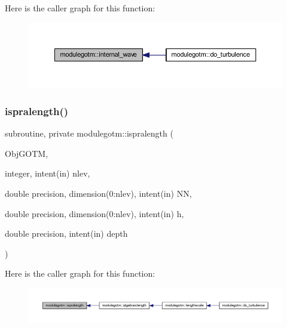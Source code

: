 Here is the caller graph for this function\+:\nopagebreak
\begin{figure}[H]
\begin{center}
\leavevmode
\includegraphics[width=350pt]{namespacemodulegotm_a4287a5fde4824d73e35ee66bf90b5f3b_icgraph}
\end{center}
\end{figure}
\mbox{\label{namespacemodulegotm_a8afda9608a508419c6574b11765db424}} 
\subsubsection{\texorpdfstring{ispralength()}{ispralength()}}
{\footnotesize\ttfamily subroutine, private modulegotm\+::ispralength (\begin{DoxyParamCaption}\item[{}]{Obj\+G\+O\+TM,  }\item[{integer, intent(in)}]{nlev,  }\item[{double precision, dimension(0\+:nlev), intent(in)}]{NN,  }\item[{double precision, dimension(0\+:nlev), intent(in)}]{h,  }\item[{double precision, intent(in)}]{depth }\end{DoxyParamCaption})\hspace{0.3cm}{\ttfamily [private]}}

Here is the caller graph for this function\+:\nopagebreak
\begin{figure}[H]
\begin{center}
\leavevmode
\includegraphics[width=350pt]{namespacemodulegotm_a8afda9608a508419c6574b11765db424_icgraph}
\end{center}
\end{figure}
\mbox{\label{namespacemodulegotm_a52589088a0366839f7e6684a9917a71a}} 

